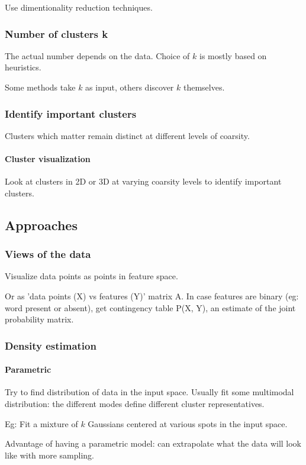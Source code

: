 \documentclass[oneside, article]{memoir}
\begin{document}
Use dimentionality reduction techniques.

\subsubsection{Number of clusters k}
The actual number depends on the data. Choice of $k$ is mostly based on heuristics.

Some methods take $k$ as input, others discover $k$ themselves.

\subsubsection{Identify important clusters}
Clusters which matter remain distinct at different levels of coarsity.

\paragraph*{Cluster visualization}
Look at clusters in 2D or 3D at varying coarsity levels to identify important clusters.

\subsection{Approaches}
\subsubsection{Views of the data}
Visualize data points as points in feature space.

Or as 'data points (X) vs features (Y)' matrix A. In case features are binary (eg: word present or absent), get contingency table P(X, Y), an estimate of the joint probability matrix.

\subsubsection{Density estimation}
\paragraph*{Parametric}
Try to find distribution of data in the input space. Usually fit some multimodal distribution: the different modes define different cluster representatives.

Eg: Fit a mixture of $k$ Gaussians centered at various spots in the input space.

Advantage of having a parametric model: can extrapolate what the data will look like with more sampling.
\end{document}
